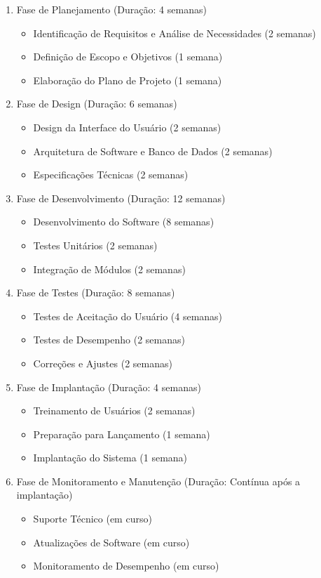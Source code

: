 \begin{enumerate}
	\item Fase de Planejamento (Duração: 4 semanas)
	\begin{itemize}
		\item Identificação de Requisitos e Análise de Necessidades (2 semanas)
		\item Definição de Escopo e Objetivos (1 semana)
		\item Elaboração do Plano de Projeto (1 semana)
	\end{itemize}
	
	\item Fase de Design (Duração: 6 semanas)
	\begin{itemize}
		\item Design da Interface do Usuário (2 semanas)
		\item Arquitetura de Software e Banco de Dados (2 semanas)
		\item Especificações Técnicas (2 semanas)
	\end{itemize}
	
	\item Fase de Desenvolvimento (Duração: 12 semanas)
	\begin{itemize}
		\item Desenvolvimento do Software (8 semanas)
		\item Testes Unitários (2 semanas)
		\item Integração de Módulos (2 semanas)
	\end{itemize}
	
	\item Fase de Testes (Duração: 8 semanas)
	\begin{itemize}
		\item Testes de Aceitação do Usuário (4 semanas)
		\item Testes de Desempenho (2 semanas)
		\item Correções e Ajustes (2 semanas)
	\end{itemize}
	
	\item Fase de Implantação (Duração: 4 semanas)
	\begin{itemize}
		\item Treinamento de Usuários (2 semanas)
		\item Preparação para Lançamento (1 semana)
		\item Implantação do Sistema (1 semana)
	\end{itemize}
	
	\item Fase de Monitoramento e Manutenção (Duração: Contínua após a implantação)
	\begin{itemize}
		\item Suporte Técnico (em curso)
		\item Atualizações de Software (em curso)
		\item Monitoramento de Desempenho (em curso)
	\end{itemize}
	
\end{enumerate}


